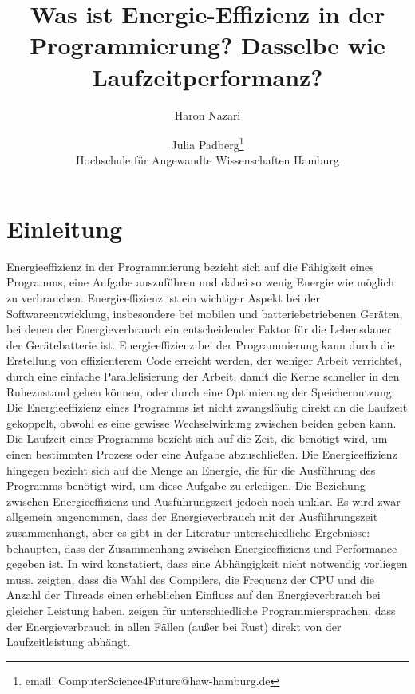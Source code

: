 \documentclass[utf8]{article}
\begin{document}

\title{Was ist Energie-Effizienz in der Programmierung? Dasselbe wie Laufzeitperformanz?}

\author{Haron Nazari
        \and Julia Padberg\footnote{email: ComputerScience4Future@haw-hamburg.de }
				\\[3mm]
				\large Hochschule für Angewandte Wissenschaften  Hamburg}

%

\maketitle
%

\section{Einleitung}
Energieeffizienz in der Programmierung bezieht sich auf die Fähigkeit eines Programms, eine Aufgabe auszuführen und dabei so wenig Energie wie möglich zu verbrauchen. Energieeffizienz ist ein wichtiger Aspekt bei der Softwareentwicklung, insbesondere bei mobilen und batteriebetriebenen Geräten, bei denen der Energieverbrauch ein entscheidender Faktor für die Lebensdauer der Gerätebatterie ist. Energieeffizienz bei der Programmierung kann durch die Erstellung von effizienterem Code erreicht werden, der weniger Arbeit verrichtet, durch eine einfache Parallelisierung der Arbeit, damit die Kerne schneller in den Ruhezustand gehen können, oder durch eine Optimierung der Speichernutzung.
Die Energieeffizienz eines Programms ist nicht zwangsläufig direkt an die Laufzeit gekoppelt, obwohl es eine gewisse Wechselwirkung zwischen beiden geben kann. Die Laufzeit eines Programms bezieht sich auf die Zeit, die benötigt wird, um einen bestimmten Prozess oder eine Aufgabe abzuschließen. Die Energieeffizienz hingegen bezieht sich auf die Menge an Energie, die für die Ausführung des Programms benötigt wird, um diese Aufgabe zu erledigen. Die Beziehung zwischen Energieeffizienz und Ausführungszeit jedoch noch unklar. Es wird zwar allgemein angenommen, dass der Energieverbrauch mit der Ausführungszeit zusammenhängt, aber es gibt in der Literatur unterschiedliche Ergebnisse: \cite{yuki_Folkore_2014} behaupten, dass der Zusammenhang zwischen Energieeffizienz und Performance gegeben ist. In \cite{pereira_energy_2017}  wird konstatiert, dass  eine Abhängigkeit nicht notwendig vorliegen muss. \cite{trefethen_energy-aware_2013}  zeigten, dass die Wahl des Compilers, die Frequenz der CPU und die Anzahl der Threads einen erheblichen Einfluss auf den Energieverbrauch bei gleicher Leistung haben. \cite{georgiou_analyzing_2017} zeigen für unterschiedliche Programmiersprachen, dass der Energieverbrauch in allen Fällen (außer bei Rust)  direkt von der Laufzeitleistung abhängt.
\end{document}
